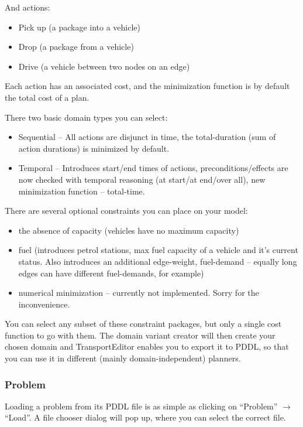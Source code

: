 And actions:

\begin{itemize}
\item Pick up (a package into a vehicle)

\item Drop (a package from a vehicle)

\item Drive (a vehicle between two nodes on an edge)
\end{itemize}

Each action has an associated cost, and the minimization function is by default the total cost of a plan.

There two basic domain types you can select:

\begin{itemize}
\item Sequential -- All actions are disjunct in time, the total-duration (sum of action durations) is minimized by default.

\item Temporal -- Introduces start/end times of actions,
preconditions/effects are now checked with temporal reasoning (at start/at end/over all),
new minimization function -- total-time.
\end{itemize}

There are several optional constraints you can place on your model:

\begin{itemize}
\item the absence of capacity (vehicles have no maximum capacity)

\item fuel (introduces petrol stations, max fuel capacity of a vehicle and it's current status.
Also introduces an additional edge-weight, fuel-demand -- equally long edges can have different
fuel-demands, for example)

\item numerical minimization -- currently not implemented. Sorry for the inconvenience.
\end{itemize}

You can select any subset of these constraint packages, but only a single cost function to go with them.
The domain variant creator will then create your chosen domain and TransportEditor enables you to export it to PDDL,
so that you can use it in different (mainly domain-independent) planners.

\subsubsection*{Problem}
Loading a problem from its PDDL file is as simple as clicking on ``Problem'' $\to$ ``Load''.
A file chooser dialog will pop up, where you can select the correct file.


